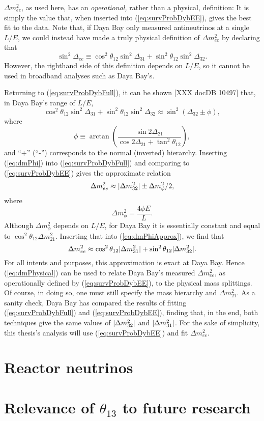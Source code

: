 \documentclass[../thesis.tex]{subfiles}
\begin{document}
$\Delta m^2_{ee}$, as used here, has an \emph{operational,} rather than a physical, definition: It is simply the value that, when inserted into (\ref{eq:survProbDybEE}), gives the best fit to the data. Note that, if Daya Bay only measured antineutrinos at a single $L/E$, we could instead have made a truly physical definition of $\Delta m^2_{ee}$ by declaring that
\[ \sin^2 \Delta_{ee} \equiv \cos^2\theta_{12} \sin^2 \Delta_{31}
  + \sin^2\theta_{12} \sin^2 \Delta_{32}. \]
However, the righthand side of this definition depends on $L/E$, so it cannot be used in broadband analyses such as Daya Bay's.

Returning to (\ref{eq:survProbDybFull}), it can be shown [XXX docDB 10497] that, in Daya Bay's range of $L/E$,
\begin{equation}
  \label{eq:dmPhi}
\cos^2\theta_{12} \sin^2\Delta_{31} + \sin^2\theta_{12}\sin^2\Delta_{32}
\approx \sin^2 (\Delta_{32} \pm \phi),
\end{equation}
where
\[\phi \equiv \arctan\left( \frac{\sin2\Delta_{21}}{\cos2\Delta_{21}+ \tan^2 \theta_{12}} \right),\]
and ``+'' (``-'') corresponds to the normal (inverted) hierarchy. Inserting (\ref{eq:dmPhi}) into (\ref{eq:survProbDybFull}) and comparing to (\ref{eq:survProbDybEE}) gives the approximate relation
\begin{equation}
  \label{eq:dmPhiApprox}
  \Delta m^2_{ee} \approx \lvert \Delta m^2_{32}\rvert \pm \Delta m^2_\phi/2,
\end{equation}
where
\[\Delta m^2_\phi = \frac{4\phi E}{L}.\]
Although $\Delta m^2_\phi$ depends on $L/E$, for Daya Bay it is essentially constant and equal to $\cos^2\theta_{12}\Delta m^2_{21}$. Inserting that into (\ref{eq:dmPhiApprox}), we find that
\begin{equation}
  \label{eq:dmPhysical}
  \Delta m^2_{ee} \approx \cos^2\theta_{12}\lvert \Delta m^2_{31}\rvert + \sin^2\theta_{12}\lvert \Delta m^2_{32}\rvert.
\end{equation}
For all intents and purposes, this approximation is exact at Daya Bay. Hence (\ref{eq:dmPhysical}) can be used to relate Daya Bay's measured $\Delta m^2_{ee}$, as operationally defined by (\ref{eq:survProbDybEE}), to the physical mass splittings. Of course, in doing so, one must still specify the mass hierarchy and $\Delta m^2_{21}.$ As a sanity check, Daya Bay has compared the results of fitting (\ref{eq:survProbDybFull}) and (\ref{eq:survProbDybEE}), finding that, in the end, both techniques give the same values of $\lvert \Delta m^2_{32}\rvert$ and $\lvert \Delta m^2_{31}\rvert$. For the sake of simplicity, this thesis's analysis will use (\ref{eq:survProbDybEE}) and fit $\Delta m^2_{ee}$.

\section{Reactor neutrinos}
\label{sec:introReactor}

\section{Relevance of $\theta_{13}$ to future research}
\label{sec:futureRelevance}
\end{document}

